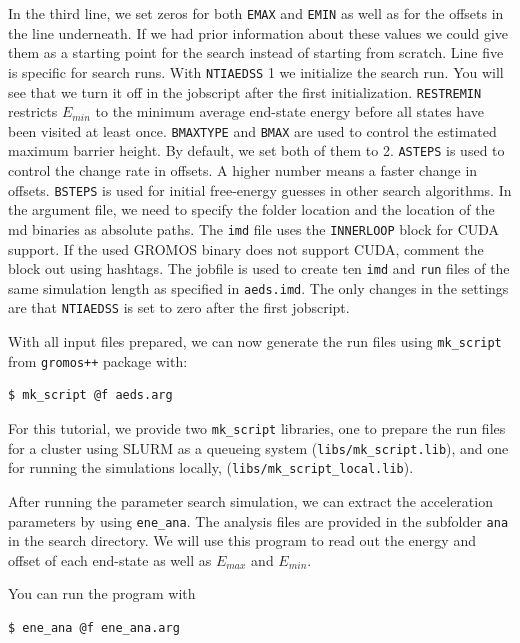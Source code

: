 In the third line, we set zeros for both \texttt{EMAX} and \texttt{EMIN} as well as for the offsets in the line underneath. If we had prior information about these values we could give them as a starting point for the search instead of starting from scratch. Line five is specific for search runs. With \texttt{NTIAEDSS} 1 we initialize the search run. You will see that we turn it off in the jobscript after the first initialization. \texttt{RESTREMIN} restricts $E_{min}$ to the minimum average end-state energy before all states have been visited at least once. \texttt{BMAXTYPE} and \texttt{BMAX} are used to control the estimated maximum barrier height. By default, we set both of them to 2. \texttt{ASTEPS} is used to control the change rate in offsets. A higher number means a faster change in offsets. \texttt{BSTEPS} is used for initial free-energy guesses in other search algorithms. In the argument file, we need to specify the folder location and the location of the md binaries as absolute paths. The \texttt{imd} file uses the \texttt{INNERLOOP} block for CUDA support. If the used GROMOS binary does not support CUDA, comment the block out using hashtags. The jobfile is used to create ten \texttt{imd} and \texttt{run} files of the same simulation length as specified in \texttt{aeds.imd}. The only changes in the settings are that 
\texttt{NTIAEDSS} is set to zero after the first jobscript.

With all input files prepared, we can now generate the run files using \texttt{mk\_script} from \texttt{gromos++} package with:
\begin{lstlisting}
$ mk_script @f aeds.arg
\end{lstlisting}

For this tutorial, we provide two \texttt{mk\_script} libraries, one to prepare the run files for a cluster using SLURM as a queueing system (\texttt{libs/mk\_script.lib}), and one for running the simulations locally, (\texttt{libs/mk\_script\_local.lib}).

After running the parameter search simulation, we can extract the acceleration parameters by using \texttt{ene\_ana}. The analysis files are provided in the subfolder \texttt{ana} in the search directory. 
We will use this program to read out the energy and offset of each end-state as well as $E_{max}$ and $E_{min}$. 

You can run the program with 
\begin{lstlisting}
$ ene_ana @f ene_ana.arg
\end{lstlisting}


